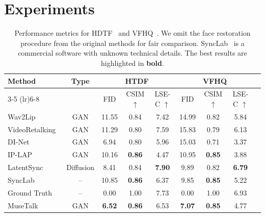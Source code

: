 \section{Experiments}
\label{sec:experiments}

\begin{table}[t]
\begin{center}
\begin{tabular}{lcccccccc}
\toprule
\multirow{2}{*}{\bf Method} & \multirow{2}{*}{\bf Type} & \multicolumn{3}{c}{\bf HTDF} & \multicolumn{3}{c}{\bf VFHQ} \\
\cmidrule(lr){3-5} \cmidrule(lr){6-8}
& & \multicolumn{1}{c}{FID } & \multicolumn{1}{c}{CSIM $\uparrow$} & \multicolumn{1}{c}{LSE-C $\uparrow$} & \multicolumn{1}{c}{FID } & \multicolumn{1}{c}{CSIM $\uparrow$} & \multicolumn{1}{c}{LSE-C $\uparrow$} \\
\midrule
Wav2Lip~\cite{prajwal2020lip} & GAN & 11.55 & 0.84 & 7.42 & 14.99 & 0.82 & 5.84 \\
VideoRetalking~\cite{cheng2022videoretalking} & GAN & 11.29 & 0.80 & 7.59 & 15.83 & 0.79 & 6.13 \\
DI-Net~\cite{zhang2023dinet} & GAN & 6.94 & 0.80 & 5.96 & 15.03 & 0.71 & 3.37 \\
IP-LAP~\cite{zhong2023identity} & GAN & 10.16 & \textbf{0.86} & 4.47 & 10.95 & \textbf{0.85} & 3.88 \\
LatentSync~\cite{li2024latentsync} & Diffusion & 8.41 & 0.84 &\textbf{7.90} & 9.89 & 0.82 & \textbf{6.79} \\
SyncLab~\cite{sync_so_projects} & – & 10.85 & \textbf{0.86} & 6.37 & 9.85 & \textbf{0.85} & 5.22 \\
\midrule
Ground Truth & – & 0.00 & 1.00 & 7.73 & 0.00 & 1.00 & 6.93 \\
\midrule
MuseTalk & GAN & \textbf{6.52} & \textbf{0.86} & 6.53 & \textbf{7.07} & \textbf{0.85} & 4.77 \\
\bottomrule
\end{tabular}%
\end{center}
\caption{Performance metrics for HDTF~\cite{zhang2021flow} and VFHQ~\cite{xie2022vfhq}.  
We omit the face restoration procedure from the original methods for fair comparison.    
SyncLab~\cite{sync_so_projects} is a commercial software with unknown technical details.
The best results are highlighted in \textbf{bold}.
}
\label{tab:performance}
\end{table}

